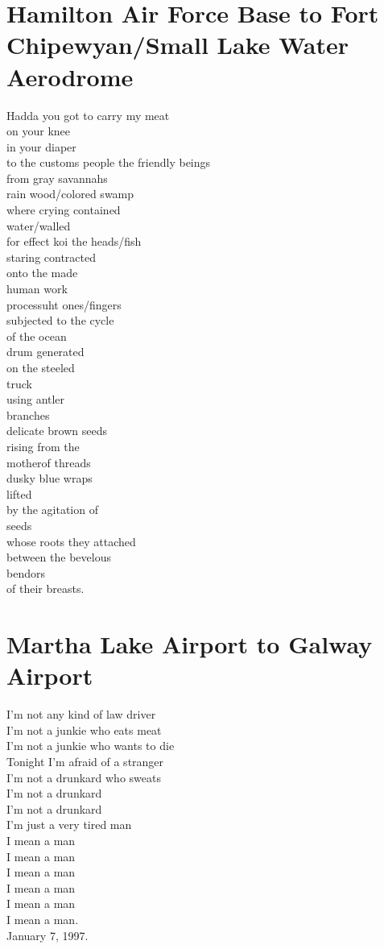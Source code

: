 \documentclass[smalldemyvopaper,11pt,twoside,onecolumn,openright,extrafontsizes]{memoir}
\begin{document}
\chapter{Hamilton Air Force Base to Fort Chipewyan/Small Lake Water Aerodrome}
Hadda you got to carry my meat
\\on your knee
\\in your diaper
\\to the customs people the friendly beings
\\from gray savannahs
\\rain wood/colored swamp
\\where crying contained
\\water/walled
\\for effect koi the heads/fish
\\staring contracted
\\onto the made
\\human work
\\processuht ones/fingers
\\subjected to the cycle
\\of the ocean
\\drum generated
\\on the steeled
\\truck
\\using antler
\\branches
\\delicate brown seeds
\\rising from the
\\motherof threads
\\dusky blue wraps
\\lifted
\\by the agitation of
\\seeds
\\whose roots they attached
\\between the bevelous
\\bendors
\\of their breasts.



\chapter{Martha Lake Airport to Galway Airport}
I'm not any kind of law driver
\\I'm not a junkie who eats meat
\\I'm not a junkie who wants to die
\\Tonight I'm afraid of a stranger
\\I'm not a drunkard who sweats
\\I'm not a drunkard
\\I'm not a drunkard
\\I'm just a very tired man
\\I mean a man
\\I mean a man
\\I mean a man
\\I mean a man
\\I mean a man
\\I mean a man.
\\January 7, 1997.
\end{document}
